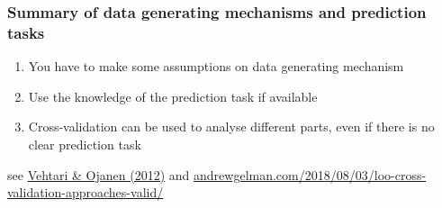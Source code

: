 \documentclass[10pt]{beamer}
\begin{document}
\begin{frame}{}

\frametitle{ Summary of data generating mechanisms and prediction tasks}

\begin{enumerate}
\item You have to make some assumptions on data generating mechanism
\item Use the knowledge of the prediction task if available
\item Cross-validation can be used to analyse different parts, even if
  there is no clear prediction task
\end{enumerate}

 \vspace{6.5\baselineskip}
{ \small see \href{http://dx.doi.org/10.1214/12-SS102}{Vehtari \& Ojanen (2012)} and \url{andrewgelman.com/2018/08/03/loo-cross-validation-approaches-valid/}}

\end{frame}


\end{document}
